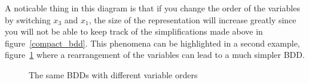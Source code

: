 \documentclass[12pt]{report}
\begin{document}
A noticable thing in this diagram is that if you change the order of the variables by switching $x_3$ and $x_1$, the size of the representation will increase greatly since you will not be able to keep track of the simplifications made above in figure~\ref{compact_bdd}. This phenomena can be highlighted in a second example, figure~\ref{reduction_bdd} where a rearrangement of the variables can lead to a much simpler BDD.

\begin{figure}[!h]
  \centering
  \caption{The same BDDs with different variable orders}
  \label{reduction_bdd}
\end{figure}
\end{document}

